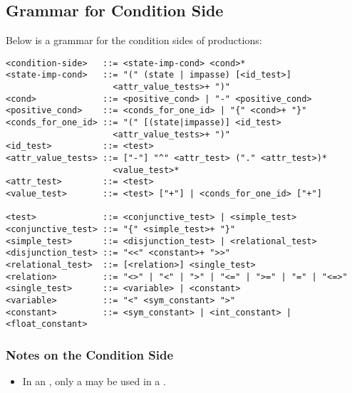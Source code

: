 \subsection{Grammar for Condition Side}
\label{SYNTAX-pm-condgrammar}


Below is a grammar for the condition sides of productions:
\begin{verbatim}
<condition-side>   ::= <state-imp-cond> <cond>*
<state-imp-cond>   ::= "(" (state | impasse) [<id_test>]
                     <attr_value_tests>+ ")"
<cond>             ::= <positive_cond> | "-" <positive_cond>
<positive_cond>    ::= <conds_for_one_id> | "{" <cond>+ "}"
<conds_for_one_id> ::= "(" [(state|impasse)] <id_test> 
                     <attr_value_tests>+ ")"
<id_test>          ::= <test>
<attr_value_tests> ::= ["-"] "^" <attr_test> ("." <attr_test>)*
                     <value_test>*
<attr_test>        ::= <test>
<value_test>       ::= <test> ["+"] | <conds_for_one_id> ["+"]  

<test>             ::= <conjunctive_test> | <simple_test>
<conjunctive_test> ::= "{" <simple_test>+ "}"
<simple_test>      ::= <disjunction_test> | <relational_test>
<disjunction_test> ::= "<<" <constant>+ ">>"
<relational_test>  ::= [<relation>] <single_test>
<relation>         ::= "<>" | "<" | ">" | "<=" | ">=" | "=" | "<=>"
<single_test>      ::= <variable> | <constant>
<variable>         ::= "<" <sym_constant> ">"
<constant>         ::= <sym_constant> | <int_constant> | <float_constant>
\end{verbatim}

\subsubsection*{Notes on the Condition Side}\vspace{-12pt}
\begin{itemize}
\item In an , only a  may be used in a .
\end{itemize}





